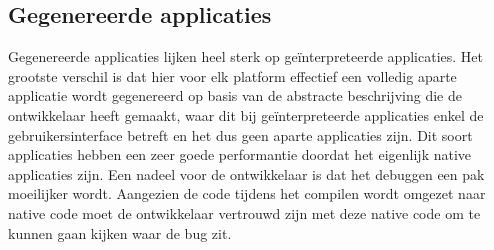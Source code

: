 \subsection{Gegenereerde applicaties}

Gegenereerde applicaties lijken heel sterk op geïnterpreteerde applicaties. Het grootste verschil is dat hier voor elk platform effectief een volledig aparte applicatie wordt gegenereerd op basis van de abstracte beschrijving die de ontwikkelaar heeft gemaakt, waar dit bij geïnterpreteerde applicaties enkel de gebruikersinterface betreft en het dus geen aparte applicaties zijn. Dit soort applicaties hebben een zeer goede performantie doordat het eigenlijk native applicaties zijn. Een nadeel voor de ontwikkelaar is dat het debuggen een pak moeilijker wordt. Aangezien de code tijdens het compilen wordt omgezet naar native code moet de ontwikkelaar vertrouwd zijn met deze native code om te kunnen gaan kijken waar de bug zit.



